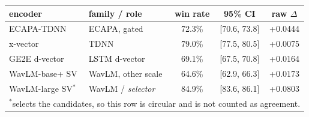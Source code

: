 \begin{tabular}{llccc}
  \toprule
  encoder & family / role & win rate & 95\% CI & raw $\Delta$ \\
  \midrule
    ECAPA-TDNN \citep{ecapa} & ECAPA, gated & 72.3\% & [70.6, 73.8] & +0.0444 \\
    x-vector \citep{xvector} & TDNN & 79.0\% & [77.5, 80.5] & +0.0075 \\
    GE2E d-vector \citep{ge2e} & LSTM d-vector & 69.1\% & [67.5, 70.8] & +0.0164 \\
    WavLM-base+ SV & WavLM, other scale & 64.6\% & [62.9, 66.3] & +0.0173 \\
    WavLM-large SV$^{\ast}$ & WavLM / \emph{selector} & 84.9\% & [83.6, 86.1] & +0.0803 \\
    \midrule
    \multicolumn{5}{l}{\footnotesize $^{\ast}$selects the candidates, so this row is circular and is not counted as agreement.} \\
  \bottomrule
\end{tabular}
